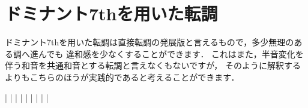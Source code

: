\documentclass[dvipdfmx,uplatex,b5paper,openany,jbase=12Q,nomag*,textwidth-limit=44%
               ]{gachimuchi}[2020/05/05]
\begin{document}
\section{ドミナント7thを用いた転調}
ドミナント7thを用いた転調は直接転調の発展版と言えるもので，多少無理のある調へ進んでも
違和感を少なくすることができます．
これはまた，半音変化を伴う和音を共通和音とする転調と言えなくもないですが，
そのように解釈するよりもこちらのほうが実践的であると考えることができます．
\begin{Music}
  \generalmeter{\meterC}%
  \Startpiece
  \NOtes
  \figbassuuu[6]%
  \figbassuuu[3][\txSharp4][6]%
  \figbassuuu[6]%
  |%
  \en\bar
  \NOtes
  \figbassuuu[\txSharp][7]%
  \figbassuuu[\txSharp][6]%
  \figbassuuu[\txFlat5][\txSharp6]%
  \figbassuuu[\txSharp]%
  |%
  \en\bar%
  \NOtes
  \figbassuuu[6]%
  \figbassuuuu[3][4][\txSharp6]%
  \figbassuuuu[6]%
  \figbassuuuu[\txFlat][5][6]%
  |%
  \en\bar%
  \NOtes
  \figbassuuuu[4][6]%
  \figbassuuuu[---][---]\sk%
  \figbassuuuu[3][5]%
  \figbassuuuu[7]\sk%
  |%
  \en\bar%
  \NOTes
  |%
  \en\setdoublebar%
  \endpiece%
\end{Music}
\end{document}
